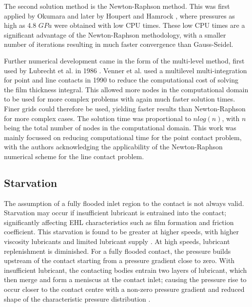 The second solution method is the Newton-Raphson method. This was first applied by Okumara \cite{Okumara1982} and later by Houpert and Hamrock \cite{Houpert1985}, where pressures as high as 4.8 $GPa$ were obtained with low CPU times. These low CPU times are a significant advantage of the Newton-Raphson methodology, with a smaller number of iterations resulting in much faster convergence than Gauss-Seidel.

Further numerical development came in the form of the multi-level method, first used by Lubrecht et al. in 1986 \cite{Lubrecht1986}. Venner et al. \cite{Venner1990} used a multilevel multi-integration for point and line contacts in 1990 to reduce the computational cost of solving the film thickness integral. This allowed more nodes in the computational domain to be used for more complex problems with again much faster solution times. Finer grids could therefore be used, yielding faster results than Newton-Raphson for more complex cases. The solution time was proportional to $n log(n)$, with $n $being the total number of nodes in the computational domain. This work was mainly focussed on reducing computational time for the point contact problem, with the authors acknowledging the applicability of the Newton-Raphson numerical scheme for the line contact problem.

\subsection{Starvation}

The assumption of a fully flooded inlet region to the contact is not always valid. Starvation may occur if insufficient lubricant is entrained into the contact; significantly affecting EHL characteristics such as film formation and friction coefficient. This starvation is found to be greater at higher speeds, with higher viscosity lubricants and limited lubricant supply \cite{Chevalier1995}. At high speeds, lubricant replenishment is diminished. For a fully flooded contact, the pressure builds upstream of the contact starting from a pressure gradient close to zero. With insufficient lubricant, the contacting bodies entrain two layers of lubricant, which then merge and form a meniscus at the contact inlet; causing the pressure rise to occur closer to the contact centre with a non-zero pressure gradient and reduced shape of the characteristic pressure distribution \cite{Lugt2011}.

